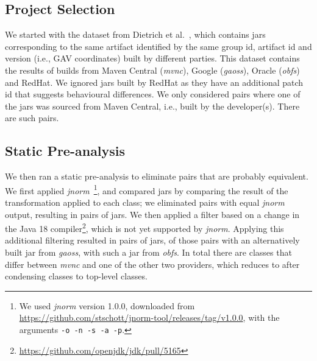 \documentclass[conference]{IEEEtran}
\newcommand{\inputgen}[1]{\unskip}
\begin{document}
\subsection{Project Selection}

We started with the dataset from Dietrich et al.~\cite{dietrich2024levelsbinaryequivalencecomparison}, which contains jars corresponding to the same artifact identified by the same group id, artifact id and version (i.e., GAV coordinates) built by different parties. This dataset contains the results of builds from Maven Central (\textit{mvnc}), Google (\textit{gaoss}), Oracle (\textit{obfs}) and  RedHat. We ignored jars built by RedHat as they have an additional patch id that suggests behavioural differences.  We only considered pairs where one of the jars was sourced from Maven Central, i.e., built by the developer(s). There are \inputgen{num-pairs-of-binaries} such pairs.


\subsection{Static Pre-analysis}

We then ran a static pre-analysis to eliminate pairs that are probably equivalent. We first applied \textit{jnorm}~\cite{schott2024JNorm}\footnote{We used \textit{jnorm} version 1.0.0, downloaded from \url{https://github.com/stschott/jnorm-tool/releases/tag/v1.0.0}, with the arguments \texttt{-o -n -s -a -p}.}, and compared jars by comparing the result of the transformation applied to each class; we eliminated pairs with equal \textit{jnorm} output, resulting in \inputgen{num-jar-pairs-after-jnorm2} pairs of jars. We then applied a filter based on a change in the Java 18 compiler\footnote{\url{https://github.com/openjdk/jdk/pull/5165}}, which is not yet supported by \textit{jnorm}. Applying this additional filtering resulted in \inputgen{num-jar-pairs-after-invokevirtual-invokeinterface} pairs of jars, \inputgen{num-jar-pairs-after-invokevirtual-invokeinterface-gaoss} of those pairs with an alternatively built jar from \textit{gaoss}, \inputgen{num-jar-pairs-after-invokevirtual-invokeinterface-obfs} with such a jar from \textit{obfs}.
In total there are \inputgen{num-class-pairs-after-invokevirtual-invokeinterface} classes that differ between \textit{mvnc} and one of the other two providers, which reduces to \inputgen{num-top-level-class-pairs-after-invokevirtual-invokeinterface} after condensing classes to top-level classes.
\end{document}
